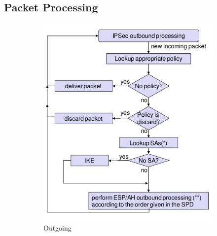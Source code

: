 \subsection{Packet Processing}
\begin{figure}[H]
  \centering
  \begin{subfigure}{.4\textwidth}
    \centering
    \includegraphics[width=\textwidth]{figures/ipsec_processing_outgoing.png}
    \caption{Outgoing}\label{fig:ipsec_processing_outgoing}
  \end{subfigure}
  \hspace{.1\textwidth}
  \begin{subfigure}{.4\textwidth}
    \centering

\end{subfigure}
\end{figure}
